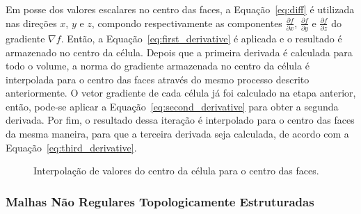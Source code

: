 	Em posse dos valores escalares no centro das faces, a Equação~\eqref{eq:diff} é utilizada nas direções $ x $, $ y $ e $ z $, compondo respectivamente as componentes $ \frac{\partial f}{\partial x} $, $ \frac{\partial f}{\partial y} $ e $ \frac{\partial f}{\partial z} $ do gradiente $ \nabla f $. Então, a Equação~\eqref{eq:first_derivative} é aplicada e o resultado é armazenado no centro da célula. Depois que a primeira derivada é calculada para todo o volume, a norma do gradiente armazenada no centro da célula é interpolada para o centro das faces através do mesmo processo descrito anteriormente. O vetor gradiente de cada célula já foi calculado na etapa anterior, então, pode-se aplicar a Equação~\eqref{eq:second_derivative} para obter a segunda derivada. Por fim, o resultado dessa iteração é interpolado para o centro das faces da mesma maneira, para que a terceira derivada seja calculada, de acordo com a Equação~\eqref{eq:third_derivative}.
	
\begin{figure}[h]
	\centering
	\caption{Interpolação de valores do centro da célula para o centro das faces.}
	\label{fig:m_cubes}
\end{figure}

\subsubsection{Malhas Não Regulares Topologicamente Estruturadas}
\label{subsec:my.nonstruct}

